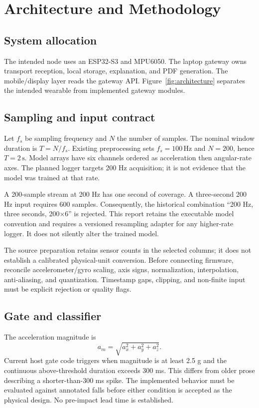 \chapter{Architecture and Methodology}
\section{System allocation}
The intended node uses an ESP32-S3 and MPU6050. The laptop gateway owns transport reception, local storage, explanation, and PDF generation. The mobile/display layer reads the gateway API. Figure~\ref{fig:architecture} separates the intended wearable from implemented gateway modules.


\section{Sampling and input contract}
Let $f_s$ be sampling frequency and $N$ the number of samples. The nominal window duration is $T=N/f_s$. Existing preprocessing sets $f_s=100\,\mathrm{Hz}$ and $N=200$, hence $T=2\,\mathrm{s}$. Model arrays have six channels ordered as acceleration then angular-rate axes. The planned logger targets 200 Hz acquisition; it is not evidence that the model was trained at that rate.

A 200-sample stream at 200 Hz has one second of coverage. A three-second 200 Hz input requires 600 samples. Consequently, the historical combination ``200 Hz, three seconds, 200$\times$6'' is rejected. This report retains the executable model convention and requires a versioned resampling adapter for any higher-rate logger. It does not silently alter the trained model.

The source preparation retains sensor counts in the selected columns; it does not establish a calibrated physical-unit conversion. Before connecting firmware, reconcile accelerometer/gyro scaling, axis signs, normalization, interpolation, anti-aliasing, and quantization. Timestamp gaps, clipping, and non-finite input must be explicit rejection or quality flags.

\section{Gate and classifier}
The acceleration magnitude is
\[
 a_m=\sqrt{a_x^2+a_y^2+a_z^2}.
\]
Current host gate code triggers when magnitude is at least 2.5 g and the continuous above-threshold duration exceeds 300 ms. This differs from older prose describing a shorter-than-300 ms spike. The implemented behavior must be evaluated against annotated falls before either condition is accepted as the physical design. No pre-impact lead time is established.

